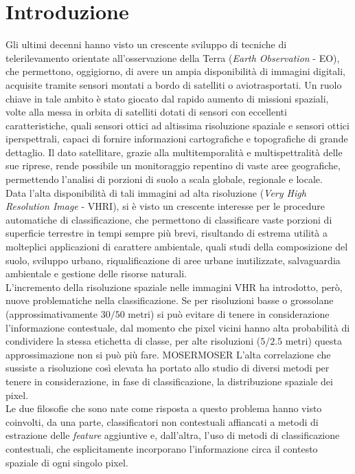 

\chapter*{Introduzione}
\label{Introduzione}

Gli ultimi decenni hanno visto un crescente sviluppo di tecniche di telerilevamento orientate all'osservazione della Terra (\emph{Earth Observation} - EO), che permettono, oggigiorno, di avere un ampia disponibilità di immagini digitali, acquisite tramite sensori montati a bordo di satelliti o aviotrasportati.
Un ruolo chiave in tale ambito è stato giocato dal rapido aumento di missioni spaziali, volte alla messa in orbita di satelliti dotati di sensori con eccellenti caratteristiche, quali sensori ottici ad altissima risoluzione spaziale e sensori ottici iperspettrali, capaci di fornire informazioni cartografiche e topografiche di grande dettaglio. 
Il dato satellitare, grazie alla multitemporalità e multispettralità delle sue riprese, rende possibile un monitoraggio repentino di vaste aree geografiche, permettendo l'analisi di porzioni di suolo a scala globale, regionale e locale.\\
Data l'alta disponibilità di tali immagini ad alta risoluzione (\emph{Very High Resolution Image} - VHRI), si è visto un crescente interesse per le procedure automatiche di classificazione, che permettono di classificare vaste porzioni di superficie terrestre in tempi sempre più brevi, risultando di estrema utilità a molteplici applicazioni di carattere ambientale, quali studi della composizione del suolo, sviluppo urbano, riqualificazione di aree urbane inutilizzate, salvaguardia ambientale e gestione delle risorse naturali.\\
L'incremento della risoluzione spaziale nelle immagini VHR ha introdotto, però, nuove problematiche nella classificazione. Se per risoluzioni basse o grossolane (approssimativamente $30/50$ metri) si può evitare di tenere in considerazione l'informazione contestuale, dal momento che pixel vicini hanno alta probabilità di condividere la stessa etichetta di classe, per alte risoluzioni ($5/2.5$ metri) questa approssimazione non si può più fare.  MOSERMOSER
L'alta correlazione che sussiste a risoluzione così elevata ha portato allo studio di diversi metodi per tenere in considerazione, in fase di classificazione, la distribuzione spaziale dei pixel.\\
Le due filosofie che sono nate come risposta a questo problema hanno visto coinvolti, da una parte, classificatori non contestuali affiancati a metodi di estrazione delle \emph{feature} aggiuntive e, dall'altra, l'uso di metodi di classificazione contestuali, che esplicitamente incorporano l'informazione circa il contesto spaziale di ogni singolo pixel.\\
